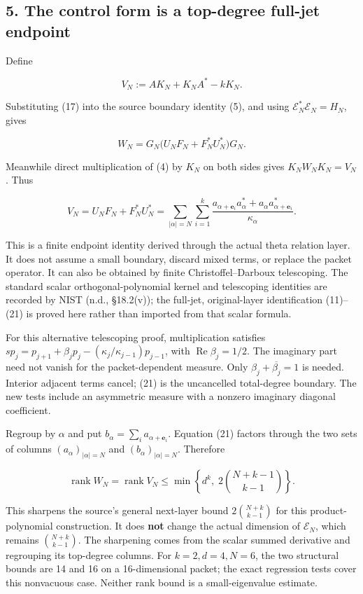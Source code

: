 \documentclass[
]{article}
\begin{document}
\subsection{5. The control form is a top-degree full-jet
endpoint}\label{the-control-form-is-a-top-degree-full-jet-endpoint}

Define

\[
\boxed{V_N:=AK_N+K_NA^*-kK_N.}
\tag{19}
\]

Substituting (17) into the source boundary identity (5), and using
\(\mathscr E_N^*\mathscr E_N=H_N\), gives

\[
\boxed{W_N=G_N\bigl(U_NF_N+F_N^*U_N^*\bigr)G_N.}
\tag{20}
\]

Meanwhile direct multiplication of (4) by \(K_N\) on both sides gives
\(K_NW_NK_N=V_N\). Thus

\[
\boxed{V_N=U_NF_N+F_N^*U_N^*
=\sum_{|\alpha|=N}\sum_{i=1}^k
\frac{a_{\alpha+\mathbf e_i}a_\alpha^*
+a_\alpha a_{\alpha+\mathbf e_i}^*}{\kappa_\alpha}.}
\tag{21}
\]

This is a finite endpoint identity derived through the actual theta
relation layer. It does not assume a small boundary, discard mixed
terms, or replace the packet operator. It can also be obtained by finite
Christoffel--Darboux telescoping. The standard scalar
orthogonal-polynomial kernel and telescoping identities are recorded by
NIST (n.d., §18.2(v)); the full-jet, original-layer identification
(11)--(21) is proved here rather than imported from that scalar formula.

For this alternative telescoping proof, multiplication satisfies
\(s p_j=p_{j+1}+\beta_jp_j-(\kappa_j/\kappa_{j-1})p_{j-1}\), with
\(\operatorname{Re}\beta_j=1/2\). The imaginary part need not vanish for
the packet-dependent measure. Only \(\beta_j+\overline{\beta_j}=1\) is
needed. Interior adjacent terms cancel; (21) is the uncancelled
total-degree boundary. The new tests include an asymmetric measure with
a nonzero imaginary diagonal coefficient.

Regroup by \(\alpha\) and put
\(b_\alpha=\sum_i a_{\alpha+\mathbf e_i}\). Equation (21) factors
through the two sets of columns \((a_\alpha)_{|\alpha|=N}\) and
\((b_\alpha)_{|\alpha|=N}\). Therefore

\[
\boxed{\operatorname{rank}W_N=\operatorname{rank}V_N
\le\min\left\{d^k,\;2\binom{N+k-1}{k-1}\right\}.}
\tag{22}
\]

This sharpens the source's general next-layer bound
\(2\binom{N+k}{k-1}\) for this product-polynomial construction. It does
\textbf{not} change the actual dimension of \(\mathcal E_N\), which
remains \(\binom{N+k}{k-1}\). The sharpening comes from the scalar
summed derivative and regrouping its top-degree columns. For
\(k=2,d=4,N=6\), the two structural bounds are 14 and 16 on a
16-dimensional packet; the exact regression tests cover this nonvacuous
case. Neither rank bound is a small-eigenvalue estimate.
\end{document}
